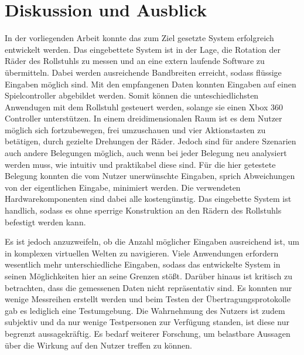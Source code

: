 \chapter{Diskussion und Ausblick}
In der vorliegenden Arbeit konnte das zum Ziel gesetzte System erfolgreich entwickelt werden.
Das eingebettete System ist in der Lage, die Rotation der Räder des Rollstuhls zu messen und an eine extern laufende Software zu übermitteln.
Dabei werden ausreichende Bandbreiten erreicht, sodass flüssige Eingaben möglich sind.
Mit den empfangenen Daten konnten Eingaben auf einen Spielcontroller abgebildet werden.
Somit können die unteschiedlichsten Anwendugen mit dem Rollstuhl gesteuert werden, solange sie einen Xbox 360 Controller unterstützen.
In einem dreidimensionalen Raum ist es dem Nutzer möglich sich fortzubewegen, frei umzuschauen und vier Aktionstasten zu betätigen, durch gezielte Drehungen der Räder.
Jedoch sind für andere Szenarien auch andere Belegungen möglich, auch wenn bei jeder Belegung neu analysiert werden muss, wie intuitiv und praktikabel diese sind.
Für die hier getestete Belegung konnten die vom Nutzer unerwünschte Eingaben, sprich Abweichungen von der eigentlichen Eingabe, minimiert werden.
Die verwendeten Hardwarekomponenten sind dabei alle kostengünstig.
Das eingebette System ist handlich, sodass es ohne sperrige Konstruktion an den Rädern des Rollstuhls befestigt werden kann.

Es ist jedoch anzuzweifeln, ob die Anzahl möglicher Eingaben ausreichend ist, um in komplexen virtuellen Welten zu navigieren.
Viele Anwendungen erfordern wesentlich mehr unterschiedliche Eingaben, sodass das entwickelte System in seinen Möglichkeiten hier an seine Grenzen stößt.
Darüber hinaus ist kritisch zu betrachten, dass die gemessenen Daten nicht repräsentativ sind.
Es konnten nur wenige Messreihen erstellt werden und beim Testen der Übertragungsprotokolle gab es lediglich eine Testumgebung.
Die Wahrnehmung des Nutzers ist zudem subjektiv und da nur wenige Testpersonen zur Verfügung standen, ist diese nur begrenzt aussagekräftig.
Es bedarf weiterer Forschung, um belastbare Aussagen über die Wirkung auf den Nutzer treffen zu können.

